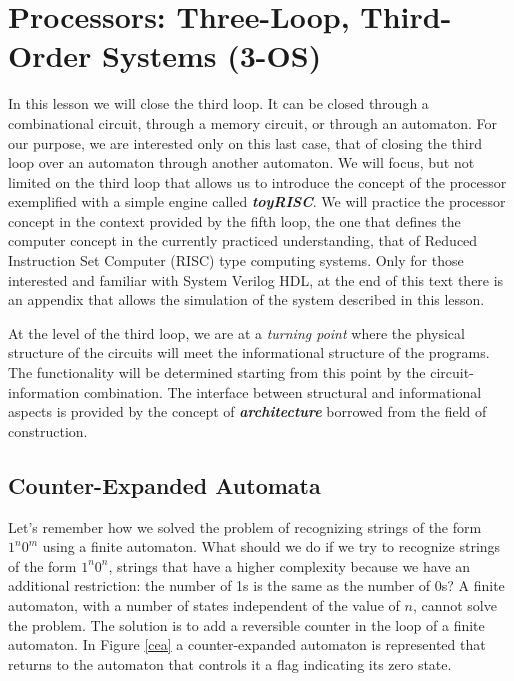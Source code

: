 \chapter{Processors: Three-Loop, Third-Order Systems (3-OS)}\label{lect4}



In this lesson we will  close the third loop. It can be closed through a combinational circuit, through a memory circuit, or through an automaton. For our purpose, we are interested only on this last case, that of closing the third loop over an automaton through another automaton. We will focus, but not limited  on the third loop that allows us to introduce the concept of the processor exemplified with a simple engine called {\bf {\em toyRISC}}. We will practice the processor concept in the context provided by the fifth loop, the one that defines the computer concept in the currently practiced understanding, that of Reduced Instruction Set Computer (RISC) type computing systems. Only for those interested and familiar with System Verilog HDL, at the end of this text there is an appendix that allows the simulation of the system described in this lesson.

At the level of the third loop, we are at a {\em turning point} where the physical structure of the circuits will meet the informational structure of the programs. The functionality will be determined starting from this point by the circuit-information combination. The interface between structural and informational aspects is provided by the concept of {\bf {\em architecture}} borrowed from the field of construction.

\section{Counter-Expanded Automata}

Let's remember how we solved the problem of recognizing strings of the form $1^n0^m$ using a finite automaton. What should we do if we try to recognize strings of the form $1^n0^n$, strings that have a higher complexity because we have an additional restriction: the number of 1s is the same as the number of 0s? A finite automaton, with a number of states independent of the value of $n$, cannot solve the problem. The solution is to add a reversible counter in the loop of a finite automaton. In Figure \ref{cea} a counter-expanded automaton is represented that returns to the automaton that controls it a flag indicating its zero state.

